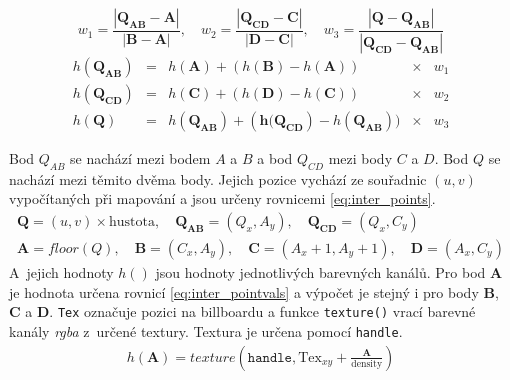 \begin{equation}
\label{eq:inter_first}
    w_1 =  \frac{|\mathbf{Q_{AB}} - \mathbf{A}|}{|\mathbf{B} - \mathbf{A}|}, \quad
    w_2 =  \frac{|\mathbf{Q_{CD}} - \mathbf{C}|}{|\mathbf{D} - \mathbf{C}|}, \quad
    w_3 =  \frac{|\mathbf{Q} - \mathbf{Q_{AB}}|}{|\mathbf{Q_{CD}} - \mathbf{Q_{AB}}|} 
\end{equation}
\begin{equation}
\label{eq:inter_second}
\begin{array}{llcll}
    h(\mathbf{Q_{AB}})& =& h(\mathbf{A}) + (h(\mathbf{B}) - h(\mathbf{A})) & \times &  w_1 \\[0,2cm]
    h(\mathbf{Q_{CD}})& =& h(\mathbf{C}) + (h(\mathbf{D}) - h(\mathbf{C})) & \times & w_2 \\[0,2cm]
    h(\mathbf{Q})& =& h(\mathbf{Q_{AB}}) + (\mathbf{h(Q_{CD}}) - h(\mathbf{Q_{AB}})) & \times &  w_3
\end{array}
\end{equation}
\pagebreak

Bod $Q_{AB}$ se nachází mezi bodem $A$ a $B$ a bod $Q_{CD}$ mezi body $C$ a $D$. Bod $Q$ se nachází mezi těmito dvěma body. Jejich pozice vychází ze souřadnic $(u,v)$ vypočítaných při mapování a jsou určeny rovnicemi \ref{eq:inter_points}.
\begin{equation}
\label{eq:inter_points}
\begin{array}{c}
    \mathbf{Q} =  (u,v) \times \text{hustota}, \quad
    \mathbf{Q_{AB}}  =  (Q_x, A_y), \quad
    \mathbf{Q_{CD}}  =  (Q_x, C_y) \\[0,5cm]
    \mathbf{A}  =  floor(Q), \quad
    \mathbf{B}  =  (C_x, A_y), \quad
    \mathbf{C}  =  (A_x + 1,A_y + 1), \quad
    \mathbf{D}  =  (A_x, C_y)
\end{array}
\end{equation}
A~jejich hodnoty $h()$ jsou hodnoty jednotlivých barevných kanálů. Pro bod $\mathbf{A}$ je hodnota určena rovnicí \ref{eq:inter_pointvals} a výpočet je stejný i pro body $\textbf{B}$, $\textbf{C}$ a $\textbf{D}$. \texttt{Tex} označuje pozici na billboardu a funkce \texttt{texture()} vrací barevné kanály \emph{rgba} z~určené textury. Textura je určena pomocí \texttt{handle}.
\begin{equation}
\label{eq:inter_pointvals}
\begin{array}{c}
    h(\mathbf{A})  =  texture\left(\texttt{handle}, \text{Tex}_{xy} + \frac{\mathbf{A}}{\text{density}}\right)

\end{array}
\end{equation}

